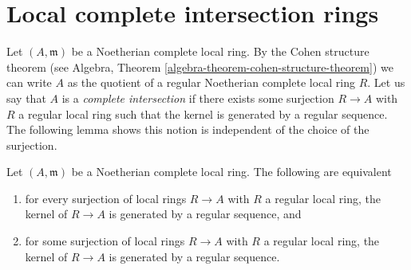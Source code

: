 \section{Local complete intersection rings}
\label{section-lci}

\noindent
Let $(A, \mathfrak m)$ be a Noetherian complete local ring.
By the Cohen structure theorem (see
Algebra, Theorem \ref{algebra-theorem-cohen-structure-theorem})
we can write $A$ as the quotient of a regular Noetherian
complete local ring $R$. Let us say that $A$ is a
{\it complete intersection}
if there exists some surjection $R \to A$
with $R$ a regular local ring such that the kernel
is generated by a regular sequence.
The following lemma shows this notion is independent of
the choice of the surjection.

\begin{lemma}
\label{lemma-ci-well-defined}
Let $(A, \mathfrak m)$ be a Noetherian complete local ring.
The following are equivalent
\begin{enumerate}
\item for every surjection of local rings $R \to A$ with $R$
a regular local ring, the kernel of $R \to A$ is generated
by a regular sequence, and
\item for some surjection of local rings $R \to A$ with $R$
a regular local ring, the kernel of $R \to A$ is generated
by a regular sequence.
\end{enumerate}
\end{lemma}

